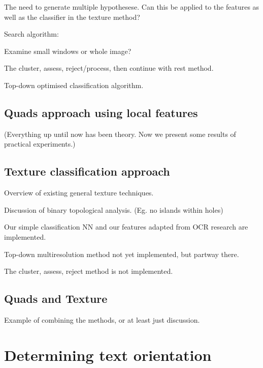 The need to generate multiple hypothesese.  Can this be applied to the features as well as the classifier in the texture method?

Search algorithm:

Examine small windows or whole image?

The cluster, assess, reject/process, then continue with rest method.

Top-down optimised classification algorithm.



\section{Quads approach using local features} %

(Everything up until now has been theory.  Now we present some results of practical experiments.)



\section{Texture classification approach} %

Overview of existing general texture techniques.

Discussion of binary topological analysis.  (Eg. no islands within holes)

Our simple classification NN and our features adapted from OCR research are implemented.

Top-down multiresolution method not yet implemented, but partway there.

The cluster, assess, reject method is not implemented.



\section{Quads and Texture} %

Example of combining the methods, or at least just discussion.




\chapter{Determining text orientation}

